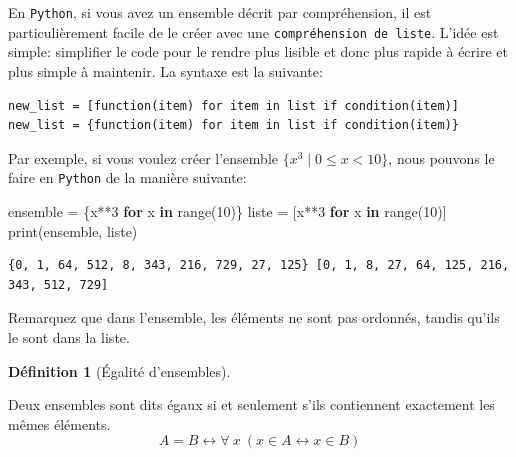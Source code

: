 \documentclass[
  letterpaper,
]{scrbook}
\newenvironment{Shaded}{}{}
\newcommand{\BuiltInTok}[1]{#1}
\newcommand{\ControlFlowTok}[1]{\textcolor[rgb]{0.00,0.44,0.13}{\textbf{#1}}}
\newcommand{\DecValTok}[1]{\textcolor[rgb]{0.25,0.63,0.44}{#1}}
\newcommand{\KeywordTok}[1]{\textcolor[rgb]{0.00,0.44,0.13}{\textbf{#1}}}
\newcommand{\NormalTok}[1]{#1}
\newcommand{\OperatorTok}[1]{\textcolor[rgb]{0.40,0.40,0.40}{#1}}
\newcommand{\set}[1]{\{#1\}}
\theoremstyle{definition}
\theoremstyle{definition}
\newtheorem{definition}{Définition}[chapter]
\theoremstyle{plain}
\theoremstyle{remark}
\begin{document}
En \texttt{Python}, si vous avez un ensemble décrit par compréhension,
il est particulièrement facile de le créer avec une
\texttt{compréhension\ de\ liste}. L'idée est simple: simplifier le code
pour le rendre plus lisible et donc plus rapide à écrire et plus simple
à maintenir. La syntaxe est la suivante:

\begin{verbatim}
new_list = [function(item) for item in list if condition(item)]
new_list = {function(item) for item in list if condition(item)}
\end{verbatim}

Par exemple, si vous voulez créer l'ensemble
\(\set{x^3\mid 0\leq x < 10}\), nous pouvons le faire en \texttt{Python}
de la manière suivante:

\hypertarget{comprehension-de-liste}{}
\begin{Shaded}
\begin{Highlighting}[]
\NormalTok{ensemble }\OperatorTok{=}\NormalTok{ \{x}\OperatorTok{**}\DecValTok{3} \ControlFlowTok{for}\NormalTok{ x }\KeywordTok{in} \BuiltInTok{range}\NormalTok{(}\DecValTok{10}\NormalTok{)\}}
\NormalTok{liste }\OperatorTok{=}\NormalTok{ [x}\OperatorTok{**}\DecValTok{3} \ControlFlowTok{for}\NormalTok{ x }\KeywordTok{in} \BuiltInTok{range}\NormalTok{(}\DecValTok{10}\NormalTok{)]}
\BuiltInTok{print}\NormalTok{(ensemble, liste)}
\end{Highlighting}
\end{Shaded}

\begin{verbatim}
{0, 1, 64, 512, 8, 343, 216, 729, 27, 125} [0, 1, 8, 27, 64, 125, 216, 343, 512, 729]
\end{verbatim}

\begin{tcolorbox}[enhanced jigsaw, colframe=quarto-callout-note-color-frame, bottomtitle=1mm, coltitle=black, breakable, arc=.35mm, title=\textcolor{quarto-callout-note-color}{\faInfo}\hspace{0.5em}{Note}, opacitybacktitle=0.6, colback=white, opacityback=0, colbacktitle=quarto-callout-note-color!10!white, leftrule=.75mm, rightrule=.15mm, titlerule=0mm, toprule=.15mm, toptitle=1mm, left=2mm, bottomrule=.15mm]

Remarquez que dans l'ensemble, les éléments ne sont pas ordonnés, tandis
qu'ils le sont dans la liste.

\end{tcolorbox}

\leavevmode{}%
\begin{definition}[Égalité d'ensembles]\label{def-egalite-ensembles}

Deux ensembles sont dits égaux si et seulement s'ils contiennent
exactement les mêmes éléments. \[
A=B \leftrightarrow \forall\ x\ (x\in A \leftrightarrow x\in B)
\]

\end{definition}
\end{document}
